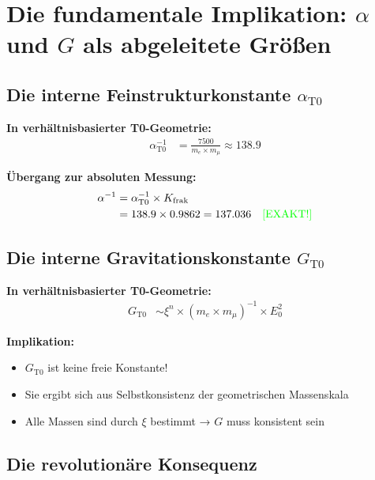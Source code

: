 \documentclass[12pt,a4paper]{article}
\begin{document}
	\section{Die fundamentale Implikation: $\alpha$ und $G$ als abgeleitete Größen}
	
	\subsection{Die interne Feinstrukturkonstante $\alpha_{\text{T0}}$}
	
	\textbf{In verhältnisbasierter T0-Geometrie:}
	\begin{align*}
		\alpha_{\text{T0}}^{-1} &= \frac{7500}{m_e \times m_μ} \approx 138.9
	\end{align*}
	
	\textbf{Übergang zur absoluten Messung:}
	\begin{align*}
		\alpha^{-1} &= \alpha_{\text{T0}}^{-1} \times K_{\text{frak}} \\
		&= 138.9 \times 0.9862 = 137.036 \quad \text{\textcolor{green}{[EXAKT!]}}
	\end{align*}
	
	\subsection{Die interne Gravitationskonstante $G_{\text{T0}}$}
	
	\textbf{In verhältnisbasierter T0-Geometrie:}
	\begin{align*}
		G_{\text{T0}} &\sim \xi^n \times (m_e \times m_μ)^{-1} \times E_0^2
	\end{align*}
	
	\textbf{Implikation:}
	\begin{itemize}
		\item $G_{\text{T0}}$ ist keine freie Konstante!
		\item Sie ergibt sich aus Selbstkonsistenz der geometrischen Massenskala
		\item Alle Massen sind durch $\xi$ bestimmt → $G$ muss konsistent sein
	\end{itemize}
	
	\subsection{Die revolutionäre Konsequenz}
	
	\begin{center}
	\end{center}
	
\end{document}
